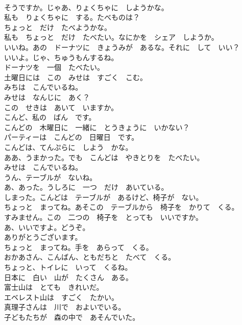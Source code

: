 \documentclass[8pt]{extreport}
\begin{document}
\begin{CJK}{UTF8}{min}
\\	そうですか。じゃあ、りょくちゃに　しようかな。	
\\	私も　りょくちゃに　する。たべものは？	
\\	ちょっと　だけ　たべようかな。	
\\	私も　ちょっと　だけ　たべたい。なにかを　シェア　しようか。	
\\	いいね。あの　ドーナツに　きょうみが　あるな。それに　して　いい？	
\\	いいよ。じゃ、ちゅうもんするね。	
\\	ドーナツを　一個　たべたい。	
\\	土曜日には　この　みせは　すごく　こむ。	
\\	みちは　こんでいるね。	
\\	みせは　なんじに　あく？	
\\	この　せきは　あいて　いますか。	
\\	こんど、私の　ばん　です。	
\\	こんどの　木曜日に　一緒に　とうきょうに　いかない？	
\\	パーティーは　こんどの　日曜日　です。	
\\	こんどは、てんぷらに　しよう　かな。	
\\	ああ、うまかった。でも　こんどは　やきとりを　たべたい。	
\\	みせは　こんでいるね。	
\\	うん、テーブルが　ないね。	
\\	あ、あった。うしろに　一つ　だけ　あいている。	
\\	しまった。こんどは　テーブルが　あるけど、椅子が　ない。	
\\	ちょっと　まってね。あそこの　テーブルから　椅子を　かりて　くる。	
\\	すみません。この　二つの　椅子を　とっても　いいですか。	
\\	あ、いいですよ。どうぞ。	
\\	ありがとうございます。	
\\	ちょっと　まってね。手を　あらって　くる。	
\\	おかあさん、こんばん、ともだちと　たべて　くる。	
\\	ちょっと、トイレに　いって　くるね。	
\\	日本に　白い　山が　たくさん　ある。	
\\	富士山は　とても　きれいだ。	
\\	エベレスト山は　すごく　たかい。	
\\	真理子さんは　川で　およいでいる。	
\\	子どもたちが　森の中で　あそんでいた。	

\end{CJK}
\end{document}

